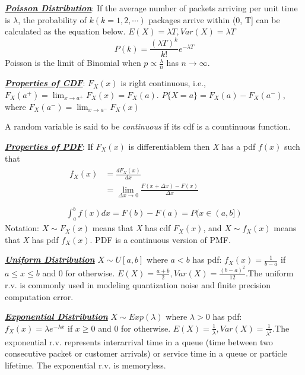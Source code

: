 \documentclass[12pt]{article}
\newcommand{\bulletPoint}[1]{\ul{\textit{\textbf{#1}}}}
\begin{document}
\begin{multicols*}{4}
\bulletPoint{Poisson Distribution}: 
If the average number of packets arriving per unit time is $\lambda$, the probability of $k (k=1,2,\cdots)$ packages arrive within (0, T] can be calculated as the equation below. $E(X)=\lambda T, Var(X)=\lambda T$
\useshortskip \begin{equation*}
    P({k}) = \frac{(\lambda T)^k}{k!} e^{-\lambda T}
\end{equation*}
Poisson is the limit of Binomial when $p \propto \frac{\lambda}{n}$ has $n \rightarrow \infty$.


\bulletPoint{Properties of CDF}:
$F_X(x)$ is right continuous, i.e., $F_X(a^+) = \lim_{x\rightarrow a^+}F_X(x) = F_X(a)$. \hfill $P\{X=a\} = F_X(a) - F_X(a^-)$, where $F_X(a^-) = \lim_{x\rightarrow a^-}F_X(x)$

A random variable is said to be \textit{continuous} if its cdf is a countinuous function.


\bulletPoint{Properties of PDF}:
If $F_X(x)$ is differentiablem then \textit{X} has a pdf $f(x)$ such that 
\useshortskip \begin{gather*}
    \begin{split}
            f_X(x) & = \frac{dF_X(x)}{dx} \\
            & = \lim_{\Delta x \rightarrow 0}{\frac{F(x + \Delta x) - F(x)}{\Delta x}} \\
    \end{split}\\
    \int^b_a f(x)dx = F(b) - F(a) = P(x \in (a, b])
\end{gather*}
Notation: $X \sim F_X(x)$ means that \textit{X} has cdf $F_X(x)$, and $X \sim f_X(x)$ means that \textit{X} has pdf $f_X(x)$. PDF is a continuous version of PMF.


\bulletPoint{Uniform Distribution}
$X \sim U[a, b]$ where $a < b$ has pdf: $f_X(x) = \frac{1}{b-a}$ if $a \leq x \leq b$ and 0 for otherwise. $E(X)=\frac{a+b}{2}, Var(X)=\frac{(b-a)^2}{12}$.The uniform r.v. is commonly used in modeling quantization noise and finite precision computation error.


\bulletPoint{Exponential Distribution}
$X \sim Exp(\lambda)$ where $\lambda > 0$ has pdf: $f_X(x) = \lambda e^{-\lambda x}$ if $x \geq 0$ and 0 for otherwise. $E(X)=\frac{1}{\lambda}, Var(X)=\frac{1}{\lambda^2}$.The exponential r.v. represents interarrival time in a queue (time between two consecutive packet or customer arrivals) or service time in a queue or particle lifetime. The exponential r.v. is memoryless.


\end{multicols*}
\end{document}

